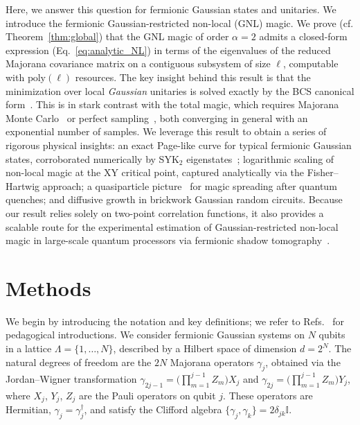 \documentclass[prx,twocolumn,superscriptaddress,aps,10pt, frontmatterverbose, reprint,footinbib,longbibliography=true]{revtex4-2}
\newcommand{\RENYI}{\alpha}
\begin{document}
Here, we answer this question for fermionic Gaussian states and unitaries. We introduce the fermionic Gaussian-restricted non-local (GNL) magic.
We prove (cf. Theorem~\ref{thm:global}) that the GNL magic of order $\RENYI=2$ admits a closed-form expression (Eq.~\eqref{eq:analytic_NL}) in terms of the eigenvalues of the reduced Majorana covariance matrix on a contiguous subsystem of size $\ell$, computable with $\mathrm{poly}(\ell)$ resources. 
The key insight behind this result is that the minimization over local \emph{Gaussian} unitaries is solved exactly by the BCS canonical form~\cite{BoteroReznik2004}. 
This is in stark contrast with the total magic, which requires Majorana Monte Carlo~\cite{Bera_2025} or perfect sampling~\cite{collura2026nonstabilizernessfermionicgaussianstates}, both converging in general with an exponential number of samples.
We leverage this result to obtain a series of rigorous physical insights: an exact Page-like curve for typical fermionic Gaussian states, corroborated numerically by SYK$_2$ eigenstates~\cite{Bera_2025,santra2025complexitytransitionschaoticquantum,jasser2025stabilizer, malvimat2026multipartitenonlocalmagicsyk, njgn-fksh}; logarithmic scaling of non-local magic at the XY critical point, captured analytically via the Fisher--Hartwig approach; a quasiparticle picture~\cite{calabrese2009} for magic spreading after quantum quenches; and diffusive growth in brickwork Gaussian random circuits.
Because our result relies solely on two-point correlation functions, it also provides a scalable route for the experimental estimation of Gaussian-restricted non-local magic in large-scale quantum processors via fermionic shadow tomography~\cite{Wan_2023}.

\section{Methods}
\label{sec:methods}
We begin by introducing the notation and key definitions; we refer to Refs.~\cite{Mbeng2024,surace,sierant2026fermionic,sierant2026theorymatchgatecommutant} for pedagogical introductions.
We consider fermionic Gaussian systems on $N$ qubits in a lattice $\Lambda=\{1,\dots, N\}$, described by a Hilbert space of dimension $d=2^N$.
The natural degrees of freedom are the $2N$ Majorana operators $\gamma_j$, obtained via the Jordan--Wigner transformation $\gamma_{2j-1} = \bigl(\prod_{m=1}^{j-1} Z_m\bigr)X_j$ and $\gamma_{2j} = \bigl(\prod_{m=1}^{j-1} Z_m\bigr)Y_j$, where $X_j$, $Y_j$, $Z_j$ are the Pauli operators on qubit $j$.
These operators are Hermitian, $\gamma_j=\gamma_j^\dagger$, and satisfy the Clifford algebra $\lbrace \gamma_j,\gamma_k\}=2 \delta_{jk} \mathbb{I}$.
\end{document}
